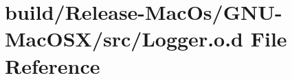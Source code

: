 \hypertarget{_release-_mac_os_2_g_n_u-_mac_o_s_x_2src_2_logger_8o_8d}{}\section{build/\+Release-\/\+Mac\+Os/\+G\+N\+U-\/\+Mac\+O\+S\+X/src/\+Logger.o.\+d File Reference}
\label{_release-_mac_os_2_g_n_u-_mac_o_s_x_2src_2_logger_8o_8d}
